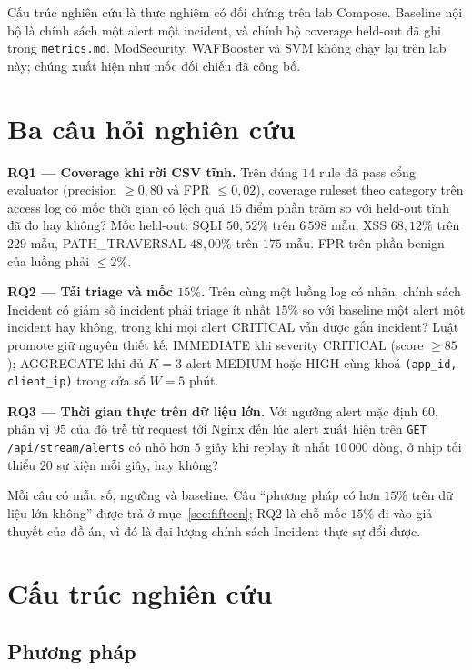 \documentclass[a4paper,11pt]{article}
\begin{document}
Cấu trúc nghiên cứu là thực nghiệm có đối chứng trên lab Compose. Baseline nội bộ là chính sách một alert một incident, và chính bộ coverage held-out đã ghi trong \texttt{metrics.md}. ModSecurity, WAFBooster và SVM không chạy lại trên lab này; chúng xuất hiện như mốc đối chiếu đã công bố.

\section{Ba câu hỏi nghiên cứu}
\label{sec:rq}

\textbf{RQ1 --- Coverage khi rời CSV tĩnh.}
Trên đúng $14$ rule đã pass cổng evaluator (precision $\geq 0{,}80$ và FPR $\leq 0{,}02$), coverage ruleset theo category trên access log có mốc thời gian có lệch quá $15$ điểm phần trăm so với held-out tĩnh đã đo hay không? Mốc held-out: SQLI $50{,}52\%$ trên $6\,598$ mẫu, XSS $68{,}12\%$ trên $229$ mẫu, PATH\_TRAVERSAL $48{,}00\%$ trên $175$ mẫu. FPR trên phần benign của luồng phải $\leq 2\%$.

\textbf{RQ2 --- Tải triage và mốc $15\%$.}
Trên cùng một luồng log có nhãn, chính sách Incident có giảm số incident phải triage ít nhất $15\%$ so với baseline một alert một incident hay không, trong khi mọi alert CRITICAL vẫn được gắn incident? Luật promote giữ nguyên thiết kế: IMMEDIATE khi severity CRITICAL (score $\geq 85$); AGGREGATE khi đủ $K{=}3$ alert MEDIUM hoặc HIGH cùng khoá \texttt{(app\_id, client\_ip)} trong cửa sổ $W{=}5$ phút.

\textbf{RQ3 --- Thời gian thực trên dữ liệu lớn.}
Với ngưỡng alert mặc định $60$, phân vị $95$ của độ trễ từ request tới Nginx đến lúc alert xuất hiện trên \texttt{GET /api/stream/alerts} có nhỏ hơn $5$ giây khi replay ít nhất $10\,000$ dòng, ở nhịp tối thiểu $20$ sự kiện mỗi giây, hay không?

Mỗi câu có mẫu số, ngưỡng và baseline. Câu ``phương pháp có hơn $15\%$ trên dữ liệu lớn không'' được trả ở mục~\ref{sec:fifteen}; RQ2 là chỗ mốc $15\%$ đi vào giả thuyết của đồ án, vì đó là đại lượng chính sách Incident thực sự đổi được.

\section{Cấu trúc nghiên cứu}

\subsection{Phương pháp}
\end{document}
